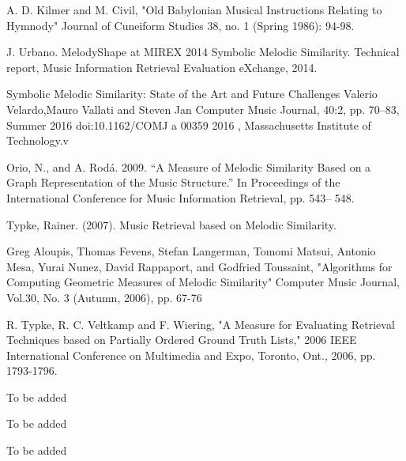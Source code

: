 \documentclass{llncs}
\begin{document}
	\begin{thebibliography}{7}
	
	A. D. Kilmer and M. Civil, 
	"Old Babylonian Musical Instructions Relating to Hymnody" 
	Journal of Cuneiform Studies 38, 
	no. 1 (Spring 1986): 94-98.

	J. Urbano. MelodyShape at 
	MIREX 2014 Symbolic Melodic Similarity. 
	Technical report, Music Information Retrieval Evaluation eXchange, 2014.

	Symbolic Melodic Similarity: State of the Art and Future Challenges
	Valerio Velardo,Mauro Vallati and Steven Jan
	Computer Music Journal, 40:2, pp. 70–83, Summer 2016 doi:10.1162/COMJ a 00359
	2016 , Massachusetts Institute of Technology.v

	 Orio, N., and A. Rodá. 2009. “A Measure of Melodic Similarity Based on a Graph Representation of the Music Structure.” In Proceedings of the International Conference for Music Information Retrieval, pp. 543– 548.

	 Typke, Rainer. (2007). Music Retrieval based on Melodic Similarity.

	 Greg Aloupis, Thomas Fevens, Stefan Langerman, Tomomi Matsui, Antonio Mesa, Yurai Nunez, David Rappaport, and Godfried Toussaint, "Algorithms for Computing Geometric Measures of Melodic Similarity" Computer Music Journal, Vol.30, No. 3 (Autumn, 2006), pp. 67-76

	 R. Typke, R. C. Veltkamp and F. Wiering, "A Measure for Evaluating Retrieval Techniques based on Partially Ordered Ground Truth Lists," 2006 IEEE International Conference on Multimedia and Expo, Toronto, Ont., 2006, pp. 1793-1796.
	
	 To be added
	
	 To be added
	
	 To be added

	\end{thebibliography}

	
\end{document}
